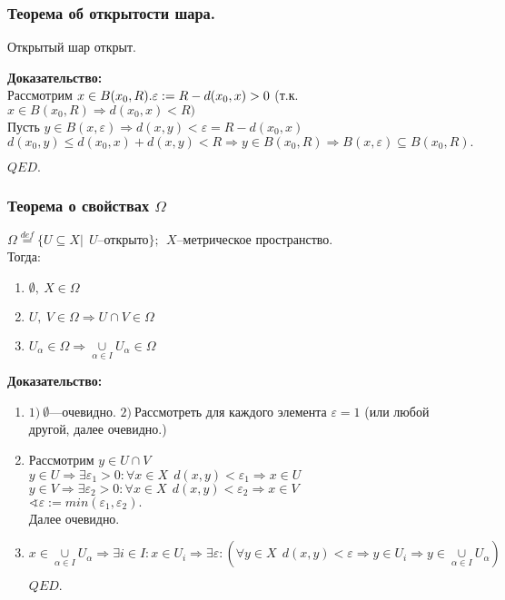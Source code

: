 \documentclass{article}
\begin{document}
\subsubsection{Теорема об открытости шара.}
Открытый шар открыт.
\begin{spacing}{1.5}
 \textbf{Доказательство:}\\
Рассмотрим $ x\in B(x_{0}, R).  \\
  \varepsilon :=R-d(x_{0}, x)>0 $
 (т.к. $x\in B(x_{0}, R)\Rightarrow d(x_{0}, x)<R)$
 \\Пусть $y\in B(x, \varepsilon)\Rightarrow d(x, y)<\varepsilon = R-d(x_{0}, x) $
 \\$d(x_{0}, y)\leq d(x_{0}, x)+d(x, y)<R\Rightarrow y\in B(x_{0}, R)\Rightarrow B(x, \varepsilon)\subseteq B(x_{0}, R). $
\begin{flushright}
$QED.$
\end{flushright}
\subsubsection{Теорема о свойствах $\Omega$}
$\Omega \overset{def}{=} \lbrace U\subseteq X |~~ U$--открыто$\rbrace;~~X$--метрическое пространство.
\\Тогда:
\begin{enumerate}
\item $\emptyset ,~X\in \Omega$
\item $U,~V\in \Omega \Rightarrow U\cap V\in \Omega$
\item $U_{\alpha}\in \Omega \Rightarrow \underset{\alpha\in I}{\cup}U_{\alpha}\in \Omega$
\end{enumerate}
 \textbf{Доказательство:}
 \begin{enumerate}
 	\item 
 	$1)~\emptyset$---очевидно.
 	$2)~$Рассмотреть для каждого элемента $\varepsilon=1$ (или любой другой, далее очевидно.)
 	\item Рассмотрим $ y\in U\cap V$
 	\\$y\in U \Rightarrow \exists \varepsilon_{1}>0:\forall x\in X~~ d(x, y)<\varepsilon_{1}\Rightarrow x\in U$
 	\\$y\in V \Rightarrow \exists \varepsilon_{2}>0:\forall x\in X~~ d(x, y)<\varepsilon_{2}\Rightarrow x\in V$
 	\\$\sphericalangle \varepsilon:=min(\varepsilon_{1}, \varepsilon_{2}).$
 	\\Далее очевидно.
 	\item $x\in \underset{\alpha\in I}{\cup}U_{\alpha}\Rightarrow \exists i\in I: x\in U_{i}\Rightarrow\exists\varepsilon : (\forall y\in X~~ d(x, y)<\varepsilon\Rightarrow y\in U_{i}\Rightarrow y\in \underset{\alpha\in I}{\cup}U_{\alpha}) $
 	\begin{flushright}
$QED.$
\end{flushright}
\end{enumerate}

\end{spacing}
\end{document}
